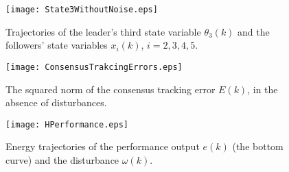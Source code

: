 \documentclass[a4paper,10pt,onecolumn]{article}
\begin{document}
       \begin{figure}[h]
      \centering
      \texttt{[image: State3WithoutNoise.eps]}
      \caption{Trajectories of the leader's third state variable $\theta_{3}(k)$ and the followers' state variables $x_{i}(k)$, $i=2,3,4,5$.}
      \label{figure4}
   \end{figure}




    \begin{figure}[h]
      \centering
      \texttt{[image: ConsensusTrakcingErrors.eps]}
      \caption{The squared norm of the consensus tracking error $E(k)$, in
        the absence of disturbances.}
      \label{figure5}
   \end{figure}


 \begin{figure}[h]
      \centering
      \texttt{[image: HPerformance.eps]}
      \caption{Energy trajectories of the
          performance output $e(k)$ (the bottom curve) and the
        disturbance $\omega(k)$.}
      \label{figure9}
   \end{figure}
\end{document}
